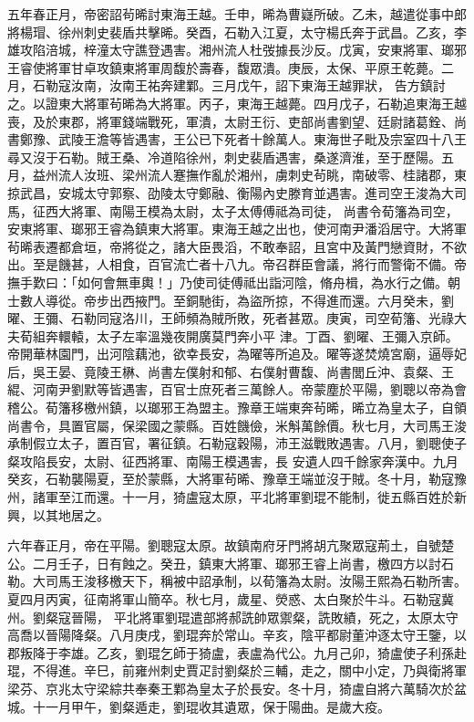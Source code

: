 \begin{pinyinscope}
 五年春正月，帝密詔茍晞討東海王越。壬申，晞為曹嶷所破。乙未，越遣從事中郎將楊瑁、徐州刺史裴盾共擊晞。癸酉，石勒入江夏，太守楊氏奔于武昌。乙亥，李雄攻陷涪城，梓潼太守譙登遇害。湘州流人杜弢據長沙反。戊寅，安東將軍、瑯邪王睿使將軍甘卓攻鎮東將軍周馥於壽春，馥眾潰。庚辰，太保、平原王乾薨。二月，石勒寇汝南，汝南王祐奔建鄴。三月戊午，詔下東海王越罪狀，
 告方鎮討之。以證東大將軍茍晞為大將軍。丙子，東海王越薨。四月戊子，石勒追東海王越喪，及於東郡，將軍錢端戰死，軍潰，太尉王衍、吏部尚書劉望、廷尉諸葛銓、尚書鄭豫、武陵王澹等皆遇害，王公已下死者十餘萬人。東海世子毗及宗室四十八王尋又沒于石勒。賊王桑、冷道陷徐州，刺史裴盾遇害，桑遂濟淮，至于歷陽。五月，益州流人汝班、梁州流人蹇撫作亂於湘州，虜刺史茍眺，南破零、桂諸郡，東掠武昌，安城太守郭察、劭陵太守鄭融、衡陽內史滕育並遇害。進司空王浚為大司馬，征西大將軍、南陽王模為太尉，太子太傅傅祗為司徒，
 尚書令荀籓為司空，安東將軍、瑯邪王睿為鎮東大將軍。東海王越之出也，使河南尹潘滔居守。大將軍茍晞表遷都倉垣，帝將從之，諸大臣畏滔，不敢奉詔，且宮中及黃門戀資財，不欲出。至是饑甚，人相食，百官流亡者十八九。帝召群臣會議，將行而警衛不備。帝撫手歎曰：「如何會無車輿！」乃使司徒傅祗出詣河陰，脩舟楫，為水行之備。朝士數人導從。帝步出西掖門。至銅馳街，為盜所掠，不得進而還。六月癸未，劉曜、王彌、石勒同寇洛川，王師頻為賊所敗，死者甚眾。庚寅，司空荀籓、光祿大夫荀組奔轘轅，太子左率溫幾夜開廣莫門奔小平
 津。丁酉、劉曜、王彌入京師。帝開華林園門，出河陰藕池，欲幸長安，為曜等所追及。曜等遂焚燒宮廟，逼辱妃后，吳王晏、竟陵王楙、尚書左僕射和郁、右僕射曹馥、尚書閭丘沖、袁粲、王緄、河南尹劉默等皆遇害，百官士庶死者三萬餘人。帝蒙塵於平陽，劉聰以帝為會稽公。荀籓移檄州鎮，以瑯邪王為盟主。豫章王端東奔茍晞，晞立為皇太子，自領尚書令，具置官屬，保梁國之蒙縣。百姓饑儉，米斛萬餘價。秋七月，大司馬王浚承制假立太子，置百官，署征鎮。石勒寇穀陽，沛王滋戰敗遇害。八月，劉聰使子粲攻陷長安，太尉、征西將軍、南陽王模遇害，長
 安遺人四千餘家奔漢中。九月癸亥，石勒襲陽夏，至於蒙縣，大將軍茍晞、豫章王端並沒于賊。冬十月，勒寇豫州，諸軍至江而還。十一月，猗盧寇太原，平北將軍劉琨不能制，徙五縣百姓於新興，以其地居之。



 六年春正月，帝在平陽。劉聰寇太原。故鎮南府牙門將胡亢聚眾寇荊土，自號楚公。二月壬子，日有蝕之。癸丑，鎮東大將軍、瑯邪王睿上尚書，檄四方以討石勒。大司馬王浚移檄天下，稱被中詔承制，以荀籓為太尉。汝陽王熙為石勒所害。夏四月丙寅，征南將軍山簡卒。秋七月，歲星、熒惑、太白聚於牛斗。石勒寇冀州。劉粲寇晉陽，
 平北將軍劉琨遣部將郝詵帥眾禦粲，詵敗績，死之，太原太守高喬以晉陽降粲。八月庚戌，劉琨奔於常山。辛亥，陰平都尉董沖逐太守王鑒，以郡叛降于李雄。乙亥，劉琨乞師于猗盧，表盧為代公。九月己卯，猗盧使子利孫赴琨，不得進。辛巳，前雍州刺史賈疋討劉粲於三輔，走之，關中小定，乃與衛將軍梁芬、京兆太守梁綜共奉秦王鄴為皇太子於長安。冬十月，猗盧自將六萬騎次於盆城。十一月甲午，劉粲遁走，劉琨收其遺眾，保于陽曲。是歲大疫。




\end{pinyinscope}
